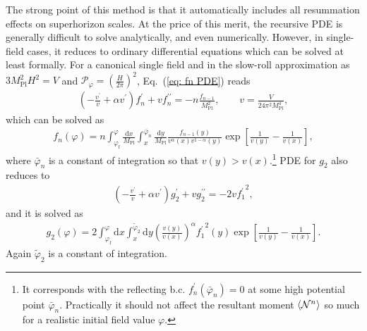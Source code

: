 \documentclass[aps, prd
, preprint
, nofootinbib 
, superscriptaddress
, longbibliography
]{revtex4-1}
\newcommand{\dd}{\mathrm{d}}
\newcommand{\Mpl}{M_\text{Pl}}
\newcommand{\uf}{\text{f}}
\newcommand{\calN}{\mathcal{N}}
\newcommand{\calP}{\mathcal{P}}
\newcommand{\bae}[1]{\begin{align} #1 \end{align}}
\begin{document}
The strong point of this method is that it automatically includes all resummation effects on superhorizon scales. At the price of this merit,
the recursive PDE is generally difficult to solve analytically, and even numerically.
However, in single-field cases, it reduces to ordinary differential equations which can be solved at least formally.
For a canonical single field and in the slow-roll approximation as $3\Mpl^2H^2=V$ and $\calP_\varphi=\left(\frac{H}{2\pi}\right)^2$, Eq.~(\ref{eq: fn PDE}) reads
\bae{
	\left(-\frac{v^\prime}{v}+\alpha v^\prime\right)f_n^\prime+vf_n^{\prime\prime}=-n\frac{f_{n-1}}{\Mpl^2}, \qquad v=\frac{V}{24\pi^2\Mpl^4},
}
which can be solved as
\bae{\label{eq: fn}
	f_n(\varphi)=n\int^\varphi_{\varphi_\uf}\frac{\dd x}{\Mpl}\int^{\bar{\varphi}_n}_x\frac{\dd y}{\Mpl}\frac{f_{n-1}(y)}{v^\alpha(x)v^{1-\alpha}(y)}
	\exp\left[\frac{1}{v(y)}-\frac{1}{v(x)}\right],
}
where $\bar{\varphi}_n$ is a constant of integration so that $v(y)>v(x)$.\footnote{It corresponds with the reflecting b.c. $f^\prime_n(\bar{\varphi}_n)=0$ at some high potential point 
$\bar{\varphi}_n$. Practically it should not affect the resultant moment $\braket{\calN^n}$ so much for a realistic initial field value $\varphi$.}
PDE for $g_2$ also reduces to
\bae{
	\left(-\frac{v^\prime}{v}+\alpha v^\prime\right)g_2^\prime+vg_2^{\prime\prime}=-2v{f_1^\prime}^2,
}
and it is solved as
\bae{\label{eq: g2}
	g_2(\varphi)=2\int^\varphi_{\varphi_\uf}\dd x\int^{\tilde{\varphi}_2}_x\dd y\left(\frac{v(y)}{v(x)}\right)^\alpha{f_1^\prime}^2(y)\exp\left[\frac{1}{v(y)}-\frac{1}{v(x)}\right].
}
Again $\tilde{\varphi}_2$ is a constant of integration.
\end{document}
